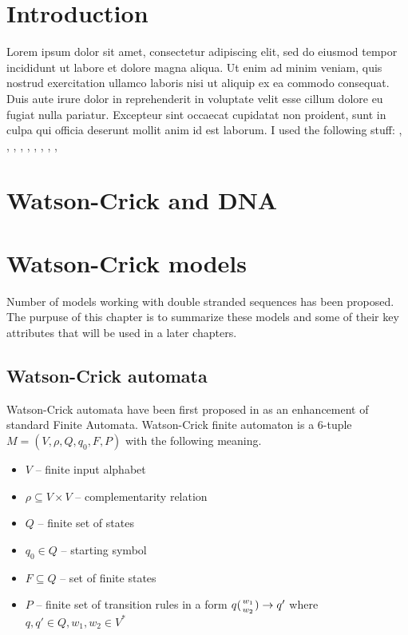 \chapter{Introduction}

Lorem ipsum dolor sit amet, consectetur adipiscing elit, sed do eiusmod tempor incididunt ut labore et dolore magna aliqua. Ut enim ad minim veniam, quis nostrud exercitation ullamco laboris nisi ut aliquip ex ea commodo consequat. Duis aute irure dolor in reprehenderit in voluptate velit esse cillum dolore eu fugiat nulla pariatur. Excepteur sint occaecat cupidatat non proident, sunt in culpa qui officia deserunt mollit anim id est laborum.
I used the following stuff: \cite{A1}, \cite{DETERM_WKA}, \cite{A3}, \cite{A4}, \cite{A5}, \cite{A6}, \cite{A7}, \cite{WK_CYK}, \cite{WK_PUSHDOWN_AUT}, \cite{WK_FIN_AUT}


\chapter{Watson-Crick and DNA}

\chapter{Watson-Crick models}
Number of models working with double stranded sequences has been proposed. The purpuse of this chapter is to summarize these models and some of their key attributes that will be used in a later chapters.


\section{Watson-Crick automata}
Watson-Crick automata have been first proposed in \cite{WK_FIN_AUT} as an enhancement of standard Finite Automata. Watson-Crick finite automaton is a 6-tuple $M = (V, \rho, Q, q_0, F, P)$ with the following meaning.
\begin{itemize}
  \item{$V$ -- finite input alphabet}
  \item{$\rho \subseteq V \times V$ -- complementarity relation}
  \item{$Q$ -- finite set of states}
  \item{$q_0 \in Q$ -- starting symbol}
  \item{$F \subseteq Q$ -- set of finite states}
  \item{$P$ -- finite set of transition rules in a form $q({w_1 \atop w_2}) \rightarrow q'$ where $q, q' \in Q, w_1, w_2 \in V^*$}
\end{itemize}

